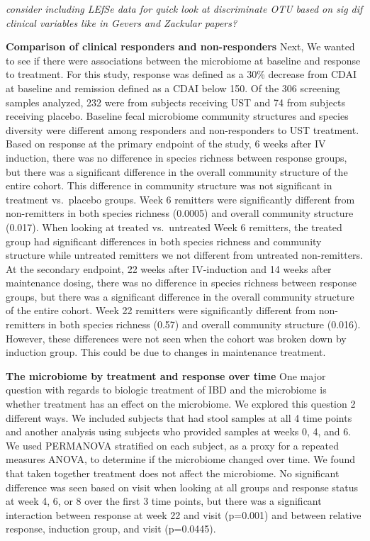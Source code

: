 \documentclass[11pt,]{article}
\begin{document}
\emph{consider including LEfSe data for quick look at discriminate OTU
based on sig dif clinical variables like in Gevers and Zackular papers?}

\textbf{Comparison of clinical responders and non-responders} Next, We
wanted to see if there were associations between the microbiome at
baseline and response to treatment. For this study, response was defined
as a 30\% decrease from CDAI at baseline and remission defined as a CDAI
below 150. Of the 306 screening samples analyzed, 232 were from subjects
receiving UST and 74 from subjects receiving placebo. Baseline fecal
microbiome community structures and species diversity were different
among responders and non-responders to UST treatment. Based on response
at the primary endpoint of the study, 6 weeks after IV induction, there
was no difference in species richness between response groups, but there
was a significant difference in the overall community structure of the
entire cohort. This difference in community structure was not
significant in treatment vs.~placebo groups. Week 6 remitters were
significantly different from non-remitters in both species richness
(0.0005) and overall community structure (0.017). When looking at
treated vs.~untreated Week 6 remitters, the treated group had
significant differences in both species richness and community structure
while untreated remitters we not different from untreated non-remitters.
At the secondary endpoint, 22 weeks after IV-induction and 14 weeks
after maintenance dosing, there was no difference in species richness
between response groups, but there was a significant difference in the
overall community structure of the entire cohort. Week 22 remitters were
significantly different from non-remitters in both species richness
(0.57) and overall community structure (0.016). However, these
differences were not seen when the cohort was broken down by induction
group. This could be due to changes in maintenance treatment.

\textbf{The microbiome by treatment and response over time} One major
question with regards to biologic treatment of IBD and the microbiome is
whether treatment has an effect on the microbiome. We explored this
question 2 different ways. We included subjects that had stool samples
at all 4 time points and another analysis using subjects who provided
samples at weeks 0, 4, and 6. We used PERMANOVA stratified on each
subject, as a proxy for a repeated measures ANOVA, to determine if the
microbiome changed over time. We found that taken together treatment
does not affect the microbiome. No significant difference was seen based
on visit when looking at all groups and response status at week 4, 6, or
8 over the first 3 time points, but there was a significant interaction
between response at week 22 and visit (p=0.001) and between relative
response, induction group, and visit (p=0.0445).
\end{document}
